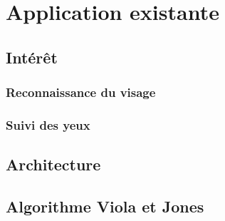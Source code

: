 \section{Application existante}

\subsection{Intérêt}

\subsubsection{Reconnaissance du visage}
\subsubsection{Suivi des yeux}

\subsection{Architecture}

\subsection{Algorithme Viola et Jones}
